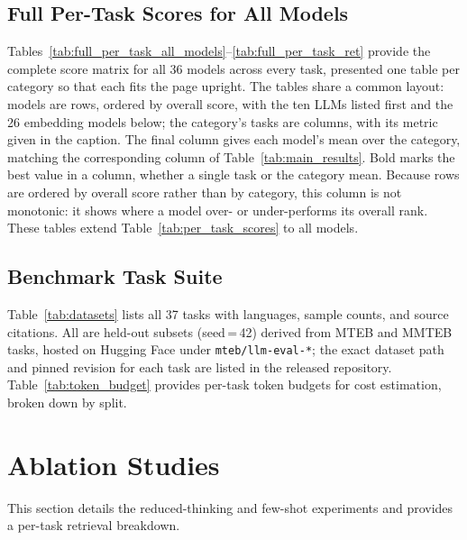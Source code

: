 

\subsection{Full Per-Task Scores for All Models}
\label{app:full_per_task_all}

Tables~\ref{tab:full_per_task_all_models}--\ref{tab:full_per_task_ret} provide the complete score matrix for all 36 models across every \mteblm{} task, presented one table per category so that each fits the page upright.
The tables share a common layout: models are rows, ordered by overall \mteblm{} score, with the ten LLMs listed first and the 26 embedding models below; the category's tasks are columns, with its metric given in the caption.
The final column gives each model's mean over the category, matching the corresponding column of Table~\ref{tab:main_results}.
Bold marks the best value in a column, whether a single task or the category mean.
Because rows are ordered by overall score rather than by category, this column is not monotonic: it shows where a model over- or under-performs its overall rank.
These tables extend Table~\ref{tab:per_task_scores} to all models.



\subsection{Benchmark Task Suite}
\label{app:datasets}

Table~\ref{tab:datasets} lists all 37 tasks with languages, sample counts, and source citations.
All are held-out subsets (seed\,=\,42) derived from MTEB and MMTEB tasks, hosted on Hugging Face under \texttt{mteb/llm-eval-*}; the exact dataset path and pinned revision for each task are listed in the released repository.
Table~\ref{tab:token_budget} provides per-task token budgets for cost estimation, broken down by split.






\section{Ablation Studies}
\label{app:ablation_detail}

This section details the reduced-thinking and few-shot experiments and provides a per-task retrieval breakdown.

